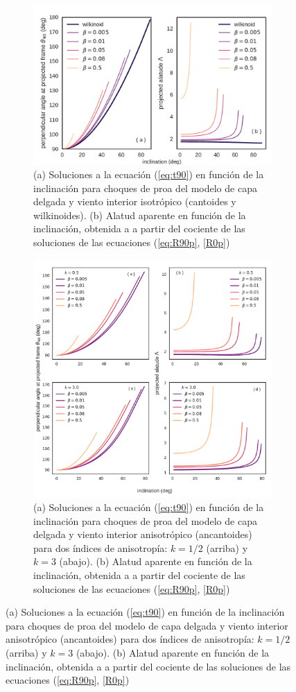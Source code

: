 \begin{figure}
\begin{figure}
  \includegraphics[width=\linewidth]{./Figures/cantoid-th90-vs-i}
  \caption{(a) Soluciones a la ecuación (\ref{eq:t90}) en función de la inclinación para choques de proa del modelo de capa delgada y viento interior isotrópico (cantoides y wilkinoides). (b) Alatud aparente en función de la inclinación, obtenida a a partir del cociente de las soluciones de las ecuaciones (\ref{eq:R90p}, \ref{R0p})}
  \label{fig:t90-isotropic}
\end{figure}

\begin{figure}
  \includegraphics[width=\linewidth]{./Figures/ancantoid-th90-vs-i}
  \caption{(a) Soluciones a la ecuación (\ref{eq:t90}) en función de la inclinación para choques de proa del modelo de capa delgada y viento interior anisotrópico (ancantoides) para dos índices de anisotropía: $k=1/2$ (arriba) y $k=3$ (abajo). (b) Alatud aparente en función de la inclinación, obtenida a a partir del cociente de las soluciones de las ecuaciones (\ref{eq:R90p}, \ref{R0p})}
  \label{fig:t90-anisotropic}
\end{figure}


\end{figure}
